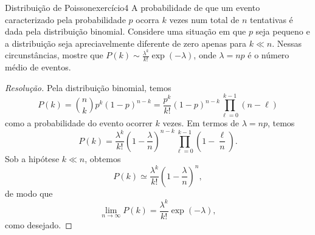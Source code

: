 \begin{exercício}{Distribuição de Poisson}{exercício4}
    A probabilidade de que um evento caracterizado pela probabilidade \(p\) ocorra \(k\) vezes num total de \(n\) tentativas é dada pela distribuição binomial. Considere uma situação em que \(p\) seja pequeno e a distribuição seja apreciavelmente diferente de zero apenas para \(k \ll n\). Nessas circunstâncias, mostre que \(P(k) \sim \frac{\lambda^k}{k!}\exp(-\lambda)\), onde \(\lambda = np\) é o número médio de eventos.
\end{exercício}
\begin{proof}[Resolução]
    Pela distribuição binomial, temos
    \begin{equation*}
        P(k) = \binom{n}{k} p^{k}(1-p)^{n - k} = \frac{p^k}{k!} (1 -p)^{n-k} \prod_{\ell = 0}^{k-1} (n - \ell)
    \end{equation*}
    como a probabilidade do evento ocorrer \(k\) vezes. Em termos de \(\lambda = np\), temos
    \begin{equation*}
        P(k) = \frac{\lambda^k}{k!} \left(1 - \frac{\lambda}{n}\right)^{n - k}\prod_{\ell = 0}^{k - 1} \left(1 - \frac{\ell}{n}\right).
    \end{equation*}
    Sob a hipótese \(k \ll n\), obtemos
    \begin{equation*}
        P(k) \simeq \frac{\lambda^k}{k!} \left(1 - \frac{\lambda}{n}\right)^{n},
    \end{equation*}
    de modo que
    \begin{equation*}
        \lim_{n \to \infty} P(k) = \frac{\lambda^k}{k!} \exp(-\lambda),
    \end{equation*}
    como desejado.
\end{proof}
